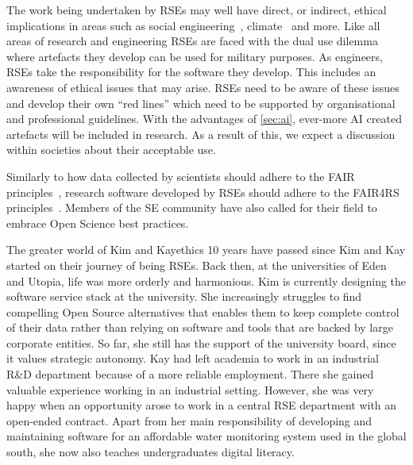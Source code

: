 \documentclass{eceasst}
\begin{document}
The work being undertaken by RSEs may well have direct, or indirect,
ethical implications in areas such as social engineering~\cite{s2erc,Siadati2024},
climate~\cite{Lannelongue2023} and more.
Like all areas of research and engineering RSEs are faced with the dual use dilemma~\cite{Bobier2024} where artefacts they develop can be used for military purposes.
As engineers, RSEs take the responsibility for the software they develop.
This includes an awareness of ethical issues that may arise.
RSEs need to be aware of these issues and develop their own ``red lines''
which need to be supported by organisational and professional guidelines.
With the advantages of \autoref{sec:ai}, ever-more AI created artefacts will be included in research.
As a result of this, we expect a discussion within societies about their acceptable use.

Similarly to how data collected by scientists should adhere to the FAIR principles~\cite{FAIR},
research software developed by RSEs should adhere to the FAIR4RS principles~\cite{FAIR4RS}.
Members of the SE community have also called for their field to embrace Open Science best practices\cite{OliveiraJr2024,Druskat2025}.

\begin{story}{The greater world of Kim and Kay}{ethics}
10 years have passed since Kim and Kay started on their journey of being RSEs. Back then,
at the universities of Eden and Utopia, life was more orderly and harmonious.
Kim is currently designing the software service stack at the university.
She increasingly struggles to find compelling Open Source alternatives that enables them to keep complete control of their data
rather than relying on software and tools that are backed by large corporate entities.
So far, she still has the support of the university board, since it values strategic autonomy.
Kay had left academia to work in an industrial R\&D department because of a more reliable employment.
There she gained valuable experience working in an industrial setting.
However, she was very happy when an opportunity arose to work in a central
RSE department with an open-ended contract. Apart from her main responsibility
of developing and maintaining software for an affordable water monitoring system
used in the global south, she now also teaches undergraduates digital literacy.
\end{story}
\end{document}
